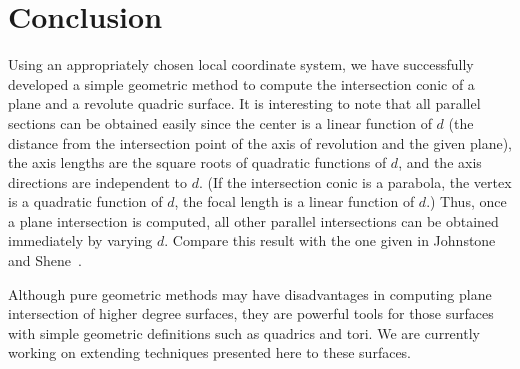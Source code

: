 
\section{Conclusion}
\label{section:conclusion}

     Using an appropriately chosen local coordinate system, we have 
successfully developed a simple geometric method to compute the intersection 
conic of a plane and a revolute quadric surface.  It is interesting to note 
that all parallel sections can be obtained easily since the center is a linear
function of $d$ (the distance from the intersection point of the axis of 
revolution and the given plane), the axis lengths are the square roots of 
quadratic functions of $d$, and the axis directions are independent to $d$. 
(If the intersection conic is a parabola, the vertex is a quadratic function 
of $d$, the focal length is a linear function of $d$.)  Thus, once a plane 
intersection is computed, all other parallel intersections can be obtained 
immediately by varying $d$.  Compare this result with the one given in
Johnstone and Shene~\cite{johnstone-shene:1991}.

     Although pure geometric methods may have disadvantages in computing
plane intersection of higher degree surfaces, they are powerful tools for those
surfaces with simple geometric definitions such as quadrics and tori.
We are currently working on extending techniques presented here to these
surfaces.


